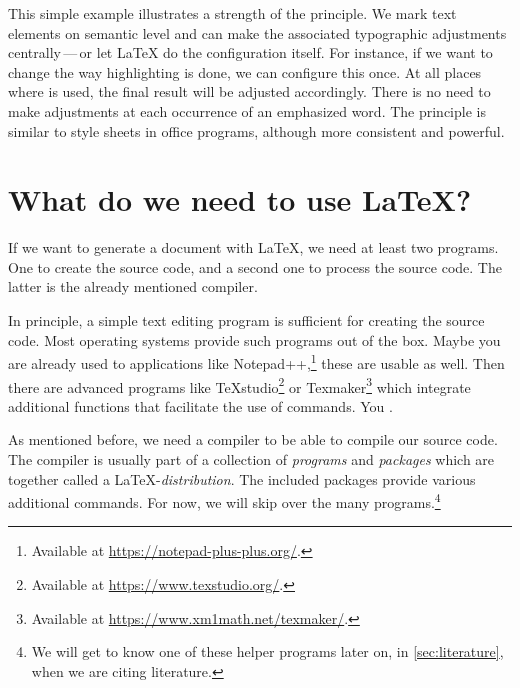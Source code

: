 This simple example illustrates a strength of the  principle. 
We mark text elements on  semantic level and can make the associated typographic adjustments centrally\,---\,or let \LaTeX{} do the configuration itself.
For instance, if we want to change the way highlighting is done, we can configure this once. 
At all places where \texttt{\emph{}} is used, the final result will be adjusted accordingly. 
There is no need to make adjustments at each occurrence of an emphasized word. 
The principle is similar to style sheets in office programs, although more consistent and powerful.

\section{What do we need to use \LaTeX{}?}
\label{subsec:what-we-need}

If we want to generate a  document with \LaTeX{}, we need at least two programs. 
One to create the source code, and a second one to process the source code. 
The latter is the already mentioned compiler.

In principle, a simple text editing program is sufficient for creating the source code. 
Most operating systems provide such programs out of the box. 
Maybe you are already used to applications like Notepad++,\footnote{Available at \url{https://notepad-plus-plus.org/}.} these are usable as well. 
Then there are advanced programs like \TeX{}studio\footnote{Available at \url{https://www.texstudio.org/}.} or Texmaker\footnote{Available at \url{https://www.xm1math.net/texmaker/}.} which integrate additional functions that facilitate the use of commands.
You .

As mentioned before, we need a compiler to be able to compile our source code.
The compiler is usually part of a collection of \emph{programs} and \emph{packages} which are together called a \LaTeX-\emph{distribution}. 
The included packages provide various additional commands. 
For now, we will skip over the many programs.\footnote{We will get to know one of these helper programs later on, in \ref{sec:literature}, when we are citing literature.}

